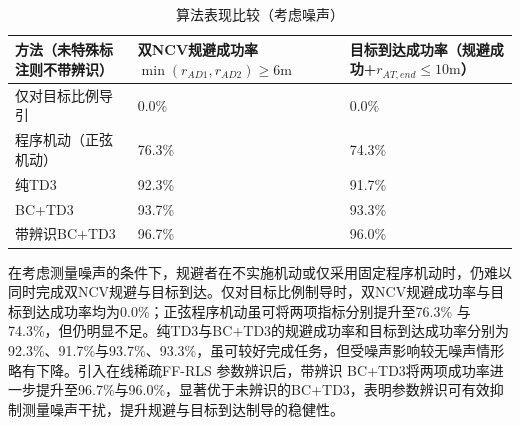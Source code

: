 \begin{table}[htbp]
\centering
\caption{算法表现比较（考虑噪声）}
\label{tab:perf-noise}
\small
\begin{tabularx}{\linewidth}{lXX}
\toprule
方法（未特殊标注则不带辨识） & 双NCV规避成功率$\min ({r_{AD1}},{r_{AD2}}) \geqslant 6{\text{m}}$ & 目标到达成功率（规避成功+${r_{AT,end}} \leqslant 10{\text{m}}$） \\
\midrule
仅对目标比例导引 & 0.0\% & 0.0\% \\
程序机动（正弦机动） & 76.3\% & 74.3\% \\
纯TD3 & 92.3\% & 91.7\% \\
BC+TD3 & 93.7\% & 93.3\% \\
带辨识BC+TD3 & 96.7\% & 96.0\% \\ %
\bottomrule
\end{tabularx}
\end{table}
在考虑测量噪声的条件下，规避者在不实施机动或仅采用固定程序机动时，仍难以同时完成双NCV规避与目标到达。仅对目标比例制导时，双NCV规避成功率与目标到达成功率均为0.0\%；正弦程序机动虽可将两项指标分别提升至76.3\% 与 74.3\%，但仍明显不足。纯TD3与BC+TD3的规避成功率和目标到达成功率分别为92.3\%、91.7\%与93.7\%、93.3\%，虽可较好完成任务，但受噪声影响较无噪声情形略有下降。引入在线稀疏FF-RLS 参数辨识后，带辨识 BC+TD3将两项成功率进一步提升至96.7\%与96.0\%，显著优于未辨识的BC+TD3，表明参数辨识可有效抑制测量噪声干扰，提升规避与目标到达制导的稳健性。

